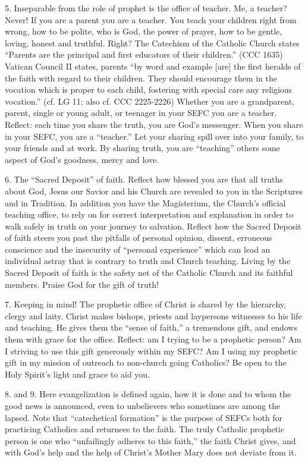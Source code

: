 \documentclass[oneside]{book}
\begin{document}
5. Inseparable from the role of prophet is the office of teacher. Me, a teacher?
Never! If you are a parent you are a teacher. You teach your children right from
wrong, how to be polite, who is God, the power of prayer, how to be gentle,
loving, honest and truthful. Right? The Catechism of the Catholic Church states
``Parents are the principal and first educators of their children.'' (CCC 1635)
Vatican Council II states, parents ``by word and example [are] the first heralds
of the faith with regard to their children. They should encourage them in the
vocation which is proper to each child, fostering with special care any
religious vocation.'' (cf. LG 11; also cf. CCC 2225-2226)
Whether you are a grandparent, parent, single or young adult, or teenager in
your SEFC you are a teacher. Reflect: each time you share the truth, you are
God's messenger. When you share in your SEFC, you are a ``teacher.'' Let your
sharing spill over into your family, to your friends and at work. By sharing
truth, you are ``teaching'' others some aspect of God's goodness, mercy and love.

6. The ``Sacred Deposit'' of faith. Reflect how blessed you are that all truths
about God, Jesus our Savior and his Church are revealed to you in the Scriptures
and in Tradition. In addition you have the Magisterium, the Church's official
teaching office, to rely on for correct interpretation and explanation in order
to walk safely in truth on your journey to salvation. Reflect how the Sacred
Deposit of faith steers you past the pitfalls of personal opinion, dissent,
erroneous conscience and the insecurity of ``personal experience'' which can
lead an individual astray that is contrary to truth and Church teaching. Living
by the Sacred Deposit of faith is the safety net of the Catholic Church and its
faithful members. Praise God for the gift of truth!



7. Keeping in mind! The prophetic office of Christ is shared by the hierarchy,
clergy and laity. Christ makes bishops, priests and laypersons witnesses to his
life and teaching. He gives them the ``sense of faith,'' a tremendous gift, and
endows them with grace for the office. Reflect: am I trying to be a prophetic
person? Am I striving to use this gift generously within my SEFC? Am I using my
prophetic gift in my mission of outreach to non-church going Catholics? Be open
to the Holy Spirit's light and grace to aid you.

8. and 9. Here evangelization is defined again, how it is done and to whom the
good news is announced, even to unbelievers who sometimes are among the
lapsed. Note that ``catechetical formation'' is the purpose of SEFCs both for
practicing Catholics and returnees to the faith. The truly Catholic prophetic
person is one who ``unfailingly adheres to this faith,'' the faith Christ gives,
and with God's help and the help of Christ's Mother Mary does not deviate from
it.
\end{document}
